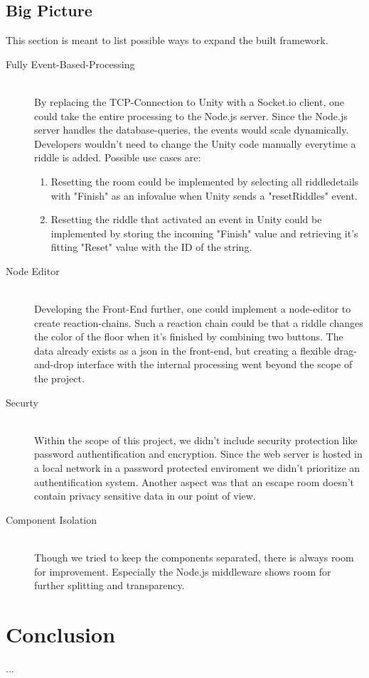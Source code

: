 \subsection{Big Picture}
This section is meant to list possible ways to expand the built framework.
\begin{description}
    \item [Fully Event-Based-Processing]\hfill \\ 
    By replacing the TCP-Connection to Unity with a Socket.io client, 
    one could take the entire processing to the Node.js server. 
    Since the Node.js server handles the database-queries,
    the events would scale dynamically. 
    Developers wouldn't need to change the Unity code manually everytime a riddle is added. 
    Possible use cases are:
    \begin{enumerate}
        \item Resetting the room could be implemented by selecting all riddledetails with "Finish" as an infovalue when Unity sends a "resetRiddles" event.
        \item 
        Resetting the riddle that activated an event in Unity could be implemented by storing the incoming "Finish" 
        value and retrieving it's fitting "Reset" value with the ID of the string.
    \end{enumerate}
    \item [Node Editor]\hfill \\
    Developing the Front-End further, one could implement a node-editor to create reaction-chains. 
    Such a reaction chain could be that a riddle changes the color of the floor when it's finished by combining two buttons. 
    The data already exists as a json in the front-end, but creating a flexible drag-and-drop interface with the internal processing 
    went beyond the scope of the project. 
    \item [Securty] \hfill \\
    Within the scope of this project, we didn't include security protection like password authentification and encryption.
    Since the web server is hosted in a local network in a password protected enviroment we didn't prioritize an authentification system.
    Another aspect was that an escape room doesn't contain privacy sensitive data in our point of view.
    \item [Component Isolation]\hfill \\
    Though we tried to keep the components separated, there is always room for improvement. 
    Especially the Node.js middleware shows room for further splitting and transparency.
\end{description}


\section{Conclusion}
...



